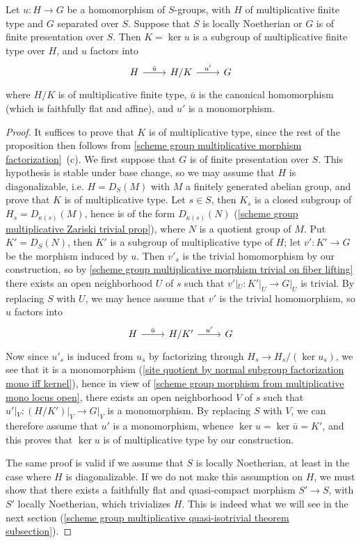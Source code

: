 \begin{theorem}\label{scheme group morphism from multiplicative factorization}
Let $u:H\to G$ be a homomorphism of $S$-groups, with $H$ of multiplicative finite type and $G$ separated over $S$. Suppose that $S$ is locally Noetherian or $G$ is of finite presentation over $S$. Then $K=\ker u$ is a subgroup of multiplicative finite type over $H$, and $u$ factors into
\[\begin{tikzcd}
H\ar[r,"\bar{u}"]&H/K\ar[r,"u'"]&G
\end{tikzcd}\]
where $H/K$ is of multiplicative finite type, $\bar{u}$ is the canonical homomorphism (which is faithfully flat and affine), and $u'$ is a monomorphism.
\end{theorem}
\begin{proof}
It suffices to prove that $K$ is of multiplicative type, since the rest of the proposition then follows from \cref{scheme group multiplicative morphism factorization}~(c). We first suppose that $G$ is of finite presentation over $S$. This hypothesis is stable under base change, so we may assume that $H$ is diagonalizable, i.e. $H=D_S(M)$ with $M$ a finitely generated abelian group, and prove that $K$ is of multiplicative type. Let $s\in S$, then $K_s$ is a closed subgroup of $H_s=D_{\kappa(s)}(M)$, hence is of the form $D_{\kappa(s)}(N)$ (\cref{scheme group multiplicative Zariski trivial prop}), where $N$ is a quotient group of $M$. Put $K'=D_S(N)$, then $K'$ is a subgroup of multiplicative type of $H$; let $v':K'\to G$ be the morphism induced by $u$. Then $v'_s$ is the trivial homomorphism by our construction, so by \cref{scheme group multiplicative morphism trivial on fiber lifting} there exists an open neighborhood $U$ of $s$ such that $v'|_U:K'|_U\to G|_U$ is trivial. By replacing $S$ with $U$, we may hence assume that $v'$ is the trivial homomorphism, so $u$ factors into
\[\begin{tikzcd}
H\ar[r,"\bar{u}"]&H/K'\ar[r,"u'"]&G
\end{tikzcd}\]
Now since $u'_s$ is induced from $u_s$ by factorizing through $H_s\to H_s/(\ker u_s)$, we see that it is a monomorphism (\cref{site quotient by normal subgroup factorization mono iff kernel}), hence in view of \cref{scheme group morphism from multiplicative mono locus open}, there exists an open neighborhood $V$ of $s$ such that $u'|_V:(H/K')|_V\to G|_V$ is a monomorphism. By replacing $S$ with $V$, we can therefore assume that $u'$ is a monomorphism, whence $\ker u=\ker\bar{u}=K'$, and this proves that $\ker u$ is of multiplicative type by our construction.\par
The same proof is valid if we assume that $S$ is locally Noetherian, at least in the case where $H$ is diagonalizable. If we do not make this assumption on $H$, we must show that there exists a faithfully flat and quasi-compact morphism $S'\to S$, with $S'$ locally Noetherian, which trivializes $H$. This is indeed what we will see in the next section (\autoref{scheme group multiplicative quasi-isotrivial theorem subsection}).
\end{proof}

